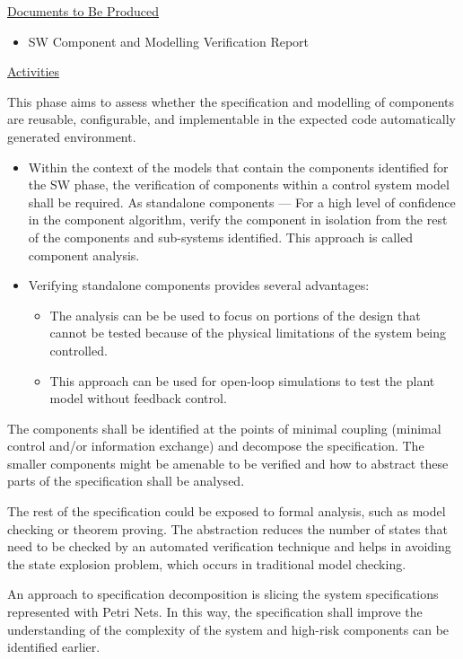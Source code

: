 \documentclass{template/openetcs_report}
\begin{document}
\underline{Documents to Be Produced} 

\begin{itemize}
\item SW Component and Modelling Verification Report
\end{itemize}

\underline{Activities}

This phase aims to assess whether the specification and modelling of components are reusable, configurable, and implementable in the expected code automatically generated environment. 

\begin{itemize}
\item Within the context of the models that contain the components identified for the SW phase, the verification of components within a control system model shall be required. 
As standalone components — For a high level of confidence in the component algorithm, verify the component in isolation from the rest of the components and sub-systems identified. This approach is called component analysis.
\item Verifying standalone components provides several advantages:
\begin{itemize}
\item The analysis can be be used to focus on portions of the design that cannot be tested because of the physical limitations of the system being controlled.
\item This approach can be used for open-loop simulations to test the plant model without feedback control.
\end{itemize}
\end{itemize}

The components shall be identified at the points of minimal coupling (minimal control and/or information exchange) and decompose the specification. The smaller components might be amenable to be verified and how to abstract these parts of the specification shall be analysed. 

The rest of the specification could be exposed to formal analysis, such as model checking or theorem proving. The abstraction reduces the number of states that need to be checked by an automated verification technique and helps in avoiding the state explosion problem, which occurs in traditional model checking.

An approach to specification decomposition is slicing the system specifications represented with Petri Nets. In this way, the specification shall improve the understanding of the complexity of the system and high-risk components can be identified earlier. 
\end{document}
